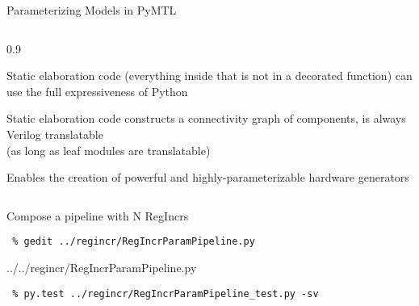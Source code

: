 \begin{frame}{Parameterizing Models in PyMTL}

\medskip
\begin{cbxcols}
\begin{column}{0.9\tw}
\begin{cbxlist}

  \1 Static elaboration code (everything inside  that is
     not in a decorated function) can use the full expressiveness of
     Python

  \1 Static elaboration code constructs a connectivity graph of
     components, is always Verilog translatable \\
     (as long as leaf modules are translatable)

  \1 Enables the creation of powerful and highly-parameterizable
     hardware generators

\end{cbxlist}
\end{column}
\end{cbxcols}
\end{frame}

\begin{task}\begin{frame}[fragile]{Compose a pipeline with N RegIncrs}

\vspace{-0.15in}
\begin{Verbatim}[commandchars=\\\{\}]
 % cd \midtilde/pymtl-tut/build
 % gedit ../regincr/RegIncrParamPipeline.py
\end{Verbatim}
\vspace{-0.2in}

%
{../../regincr/RegIncrParamPipeline.py}

\vspace{-0.22in}
\begin{Verbatim}
 % py.test ../regincr/RegIncrParamPipeline_test.py -sv
\end{Verbatim}

\vspace{-2.35in}\hspace*{2.8in}

\end{frame}
\end{task}

